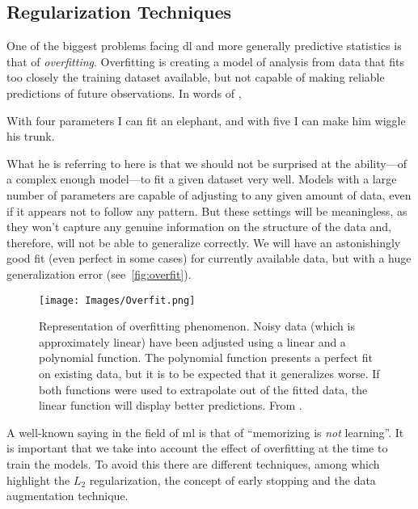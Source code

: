 \subsection{Regularization Techniques}%
\label{sec:regularization}

One of the biggest problems facing \gls{dl} and more generally predictive
statistics is that of \emph{overfitting}. Overfitting is
creating a model of analysis from data that fits too closely the training
dataset available, but not capable of making reliable predictions of future
observations. In words of ,
\begin{quoteBox}
  With four parameters I can fit an elephant, and with five I can make him
  wiggle his trunk.
  \tcblower{}
\end{quoteBox}

What he is referring to here is that we should not be surprised at the
ability---of a complex enough model---to fit a given dataset very well. Models
with a large number of parameters are capable of adjusting to any given amount
of data, even if it appears not to follow any pattern. But these settings will
be meaningless, as they won't capture any genuine information on the structure
of the data and, therefore, will not be able to generalize correctly. We will
have an astonishingly good fit (even perfect in some cases) for currently
available data, but with a huge generalization error (see\ \vref{fig:overfit}).

\begin{figure}[ht]
  \centering
  \texttt{[image: Images/Overfit.png]}
  \caption[Representation of the overfitting phenomenon.]{Representation of
    overfitting phenomenon. Noisy data (which is approximately linear) have
    been adjusted using a linear and a polynomial function. The polynomial
    function presents a perfect fit on existing data, but it is to be expected
    that it generalizes worse. If both functions were used to extrapolate out
    of the fitted data, the linear function will display better
    predictions. From .}%
  \label{fig:overfit}
\end{figure}

A well-known saying in the field of \gls{ml} is that of ``memorizing is
\emph{not} learning''. It is important that we take into account the effect of
overfitting at the time to train the models. To avoid this
there are different techniques, among which highlight the \(L_2\)
regularization, the concept of early stopping and the data augmentation
technique.

